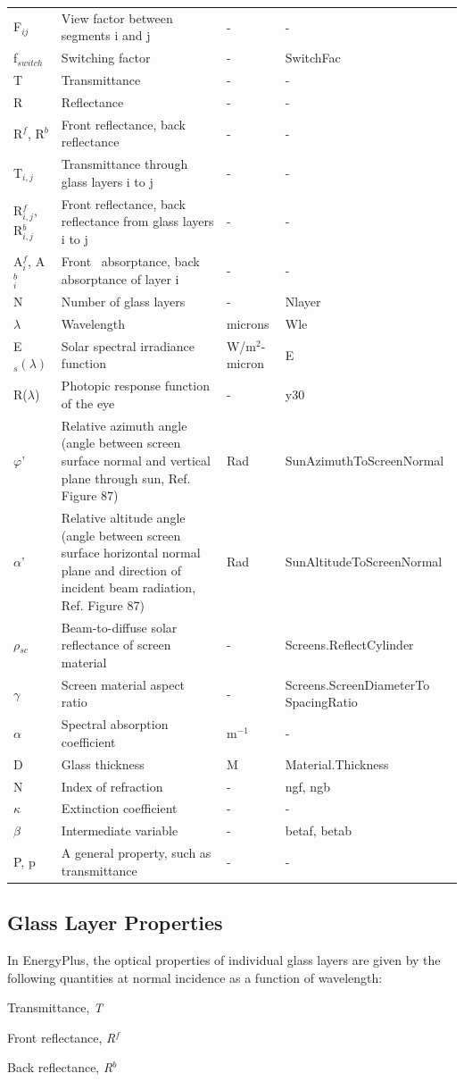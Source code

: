 \begin{longtable}[c]{p{1.0in}p{2.5in}p{1.0in}p{1.5in}}
F\(_{ij}\) & View factor between segments i and j & - & - \tabularnewline
f\(_{switch}\) & Switching factor & - & SwitchFac \tabularnewline
T & Transmittance & - & - \tabularnewline
R & Reflectance & - & - \tabularnewline
R\(^f\), R\(^b\) & Front reflectance, back reflectance & - & - \tabularnewline
T\(_{i,j}\) & Transmittance through glass layers i to j & - & - \tabularnewline
R\(^f_{i,j}\), R\(^b_{i,j}\) & Front reflectance, back reflectance from glass layers i to j & - & - \tabularnewline
A\(^f_i\), A\(^b_i\) & Front~ absorptance, back absorptance of layer i & - & - \tabularnewline
N & Number of glass layers & - & Nlayer \tabularnewline
\(\lambda\) & Wavelength & microns & Wle \tabularnewline
E\(_s (\lambda)\) & Solar spectral irradiance function & W/m\(^2\)-micron & E \tabularnewline
R($\lambda$) & Photopic response function of the eye & - & y30 \tabularnewline
$\varphi$' & Relative azimuth angle (angle between screen surface normal and vertical plane through sun, Ref. Figure 87) & Rad & SunAzimuthToScreenNormal \tabularnewline
$\alpha$' & Relative altitude angle (angle between screen surface horizontal normal plane and direction of incident beam radiation, Ref. Figure 87) & Rad & SunAltitudeToScreenNormal \tabularnewline
$\rho$\(_{sc}\) & Beam-to-diffuse solar reflectance of screen material & - & Screens.ReflectCylinder \tabularnewline
$\gamma$ & Screen material aspect ratio & - & Screens.ScreenDiameterTo SpacingRatio \tabularnewline
\(\alpha\) & Spectral absorption coefficient & m\(^{-1}\) & - \tabularnewline
D & Glass thickness & M & Material.Thickness \tabularnewline
N & Index of refraction & - & ngf, ngb \tabularnewline
\(\kappa\) & Extinction coefficient & - & - \tabularnewline
\(\beta\) & Intermediate variable & - & betaf, betab \tabularnewline
P, p & A general property, such as transmittance & - & - \tabularnewline
\bottomrule
\end{longtable}

\subsection{Glass Layer Properties}\label{glass-layer-properties}

In EnergyPlus, the optical properties of individual glass layers are given by the following quantities at normal incidence as a function of wavelength:

Transmittance, \emph{T}

Front reflectance, \emph{R\(^{f}\)}

Back reflectance, \emph{R\(^{b}\)}

